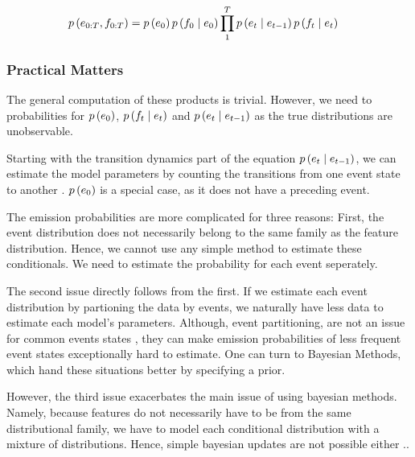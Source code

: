 \documentclass[./../../paper.tex]{subfiles}
\begin{document}
\begin{align}
    p\left(e_{0:T},f_{0:T}\right) & = p\left(e_0\right)p\left(f_0 \mid e_0\right)\prod_1^T p\left(e_t \mid e_{t-1}\right) p\left(f_t \mid e_t\right)
\end{align}


\subsubsection{Practical Matters}
The general computation of these products is trivial. However, we need to probabilities for $p\left(e_0\right)$, $p\left(f_t \mid e_t\right)$ and $p\left(e_t \mid e_{t-1}\right)$ as the true distributions are unobservable.

Starting with the transition dynamics part of the equation $p\left(e_t \mid e_{t-1}\right)$, we can estimate the model parameters by counting the transitions from one event state  to another . $p\left(e_0\right)$ is a special case, as it does not have a preceding event.

The emission probabilities are more complicated for three reasons: First, the event distribution does not necessarily belong to the same family as the feature distribution. Hence, we cannot use any simple method to estimate these conditionals. We need to estimate the probability for each event seperately. 

The second issue directly follows from the first. If we estimate each event distribution by partioning the data by events, we naturally have less data to estimate each model's parameters. Although, event partitioning, are not an issue for common events states , they can make emission probabilities of less frequent event states exceptionally hard to estimate.
One can turn to Bayesian Methods, which hand these situations better by specifying a prior.

However, the third issue exacerbates the main issue of using bayesian methods. Namely, because features do not necessarily have to be from the same distributional family, we have to model each conditional distribution with a mixture of distributions. Hence, simple bayesian updates are not possible either ..
\end{document}
